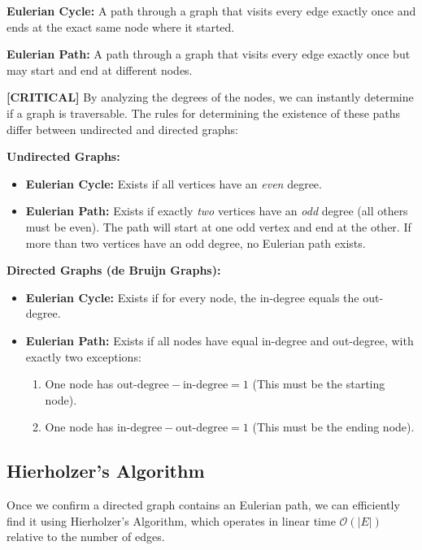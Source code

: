 \documentclass[11pt,a4paper]{article}
\newenvironment{important}{%
    \begin{tcolorbox}[colback=blue!5, colframe=blue!80!black, arc=4mm, boxrule=1pt]
}{%
    \end{tcolorbox}
}
\newcommand{\sta}{\textbf{[CRITICAL] }}
\begin{document}
\begin{important}
    \textbf{Eulerian Cycle:} A path through a graph that visits every edge exactly once and ends at the exact same node where it started. 
    
    \textbf{Eulerian Path:} A path through a graph that visits every edge exactly once but may start and end at different nodes.
\end{important}

\sta By analyzing the degrees of the nodes, we can instantly determine if a graph is traversable.
The rules for determining the existence of these paths differ between undirected and directed graphs:

\textbf{Undirected Graphs:}
\begin{itemize}
    \item \textbf{Eulerian Cycle:} Exists if all vertices have an \textit{even} degree.
    \item \textbf{Eulerian Path:} Exists if exactly \textit{two} vertices have an \textit{odd} degree (all others must be even). The path will start at one odd vertex and end at the other. If more than two vertices have an odd degree, no Eulerian path exists.
\end{itemize}

\textbf{Directed Graphs (de Bruijn Graphs):}
\begin{itemize}
    \item \textbf{Eulerian Cycle:} Exists if for every node, the in-degree equals the out-degree.
    \item \textbf{Eulerian Path:} Exists if all nodes have equal in-degree and out-degree, with exactly two exceptions:
    \begin{enumerate}
        \item One node has $\text{out-degree} - \text{in-degree} = 1$ (This must be the starting node).
        \item One node has $\text{in-degree} - \text{out-degree} = 1$ (This must be the ending node).
    \end{enumerate}
\end{itemize}

\subsection{Hierholzer's Algorithm}
Once we confirm a directed graph contains an Eulerian path, we can efficiently find it using Hierholzer's Algorithm, which operates in linear time $\mathcal{O}(|E|)$ relative to the number of edges.
\end{document}
